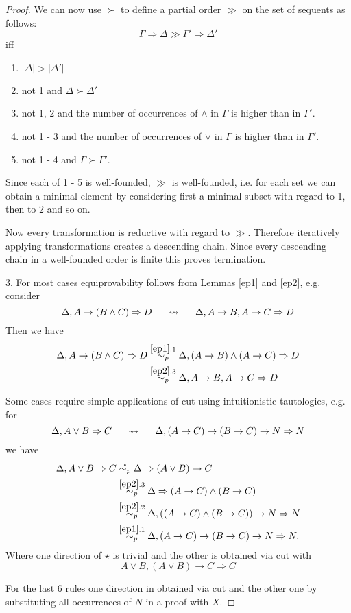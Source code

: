 \documentclass[a4paper,12pt]{article}
\theoremstyle{definition}
\theoremstyle{definition}
\theoremstyle{definition}
\theoremstyle{definition}
\theoremstyle{definition}
\theoremstyle{definition}
\begin{document}
\begin{proof}[Proof]
		
	 	We can now use $\succ$ to define a partial order $\gg$ on the set of sequents as follows: $$\Gamma\Rightarrow\Delta \gg \Gamma'\Rightarrow\Delta'$$ iff
		\begin{enumerate}
			\item $|\Delta| > |\Delta'|$ 
			\item not 1 and $\Delta \succ \Delta'$
			\item not 1, 2 and the number of occurrences of $\wedge$ in $\Gamma$ is higher than in $\Gamma' $.
			\item not 1 - 3 and the number of occurrences of $\vee$ in $\Gamma$ is higher than in $\Gamma' $.
			\item not 1 - 4 and $\Gamma \succ\Gamma' $.
		\end{enumerate}
		Since each of 1 - 5 is well-founded, $\gg$ is well-founded, i.e. for each set we can obtain a minimal element by considering first a minimal subset with regard to 1, then to 2 and so on.
		
		Now every transformation is reductive with regard to $\gg$. Therefore iteratively applying transformations creates a descending chain. Since every descending chain in a well-founded order is finite this proves termination.
		 
		3. For most cases equiprovability follows from Lemmas \ref{ep1} and \ref{ep2}, e.g. consider $$\Delta, A\to (B\wedge C)\Rightarrow D\indent\rightsquigarrow\indent\Delta, A\to B, A\to C\Rightarrow D$$Then we have
		\begin{align*}
			\Delta, A\to (B\wedge C)\Rightarrow D&\overset{\ref{ep1}.1}{\sim_p}\Delta, (A\to B)\wedge (A\to C)\Rightarrow D\\&\overset{\ref{ep2}.3}{\sim_p}\Delta, A\to B, A\to C\Rightarrow D
		\end{align*}
		
		Some cases require simple applications of cut using intuitionistic tautologies, e.g. for
		$$\Delta, A\vee B\Rightarrow C\indent\rightsquigarrow\indent\Delta, (A\to C)\to (B\to C)\to N\Rightarrow  N$$
		we have 
		\begin{align*}
			\Delta, A\vee B\Rightarrow C&\overset{\star}{\sim_p}\Delta\Rightarrow (A\vee B)\to C\\&\overset{\ref{ep2}.3}{\sim_p}\Delta\Rightarrow (A\to C)\wedge(B\to C)\\&\overset{\ref{ep2}.2}{\sim_p} \Delta, ((A\to C)\wedge (B\to C))\to N\Rightarrow N\\&\overset{\ref{ep1}.1}{\sim_p}\Delta, (A\to C)\to(B\to C)\to N\Rightarrow N.
		\end{align*}
		Where one direction of $\star$ is trivial and the other is obtained via cut with $$A\vee B, (A\vee B)\to C\Rightarrow C$$
		
		For the last 6 rules one direction in obtained via cut and the other one by substituting all occurrences of $N$ in a proof with $X$.
	\end{proof}
	
\end{document}
